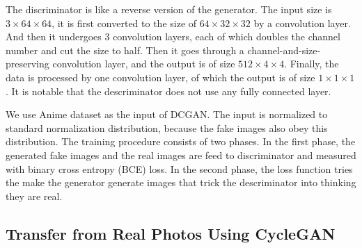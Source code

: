 \documentclass[10pt,twocolumn,letterpaper]{article}
\begin{document}
The discriminator is like a reverse version of the generator. The input size is
$3\times 64\times 64$, it is first converted to the size of
$64\times 32\times 32$ by a convolution layer. And then it undergoes 3
convolution layers, each of which doubles the channel number and cut the size to
half. Then it goes through a channel-and-size-preserving convolution layer, and
the output is of size $512\times 4\times 4$. Finally, the data is processed by
one convolution layer, of which the output is of size $1\times 1\times 1$. It is
notable that the descriminator does not use any fully connected layer.

We use Anime dataset as the input of DCGAN. The input is normalized to standard
normalization distribution, because the fake images also obey this distribution.
The training procedure consists of two phases. In the first phase, the generated
fake images and the real images are feed to discriminator and measured with
binary cross entropy (BCE) loss. In the second phase, the loss function tries
the make the generator generate images that trick the descriminator into
thinking they are real.

\subsection{Transfer from Real Photos Using CycleGAN}
\end{document}
